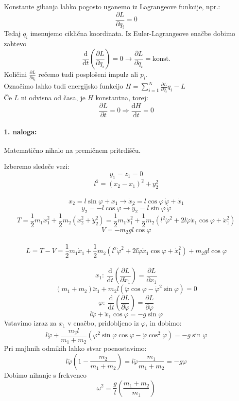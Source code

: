 \documentclass[a4paper]{article}
\newcommand{\pd}[2]{\frac{\partial {#1}}{\partial {#2}}}
\newcommand{\dd}[2]{\frac{\mathrm{d} {#1}}{\mathrm{d} {#2}}}
\begin{document}
Konstante gibanja lahko pogosto uganemo iz Lagrangeove funkcije, npr.:
$$\pd{L}{q_i} = 0$$
Tedaj $q_i$ imenujemo ciklična koordinata. Iz Euler-Lagrangeove enačbe dobimo zahtevo
$$\dd{}{t}\left(\pd{L}{\dot{q}_i}\right) = 0 \rightarrow \pd{L}{\dot{q}_i} = \text{konst.}$$
Količini $\displaystyle{\pd{L}{\dot{q}_i}}$ rečemo tudi posplošeni impulz ali $p_i$. \\[4mm]

Označimo lahko tudi energijsko funkcijo $\displaystyle{H = \sum_{i=1}^{N} \pd{L}{\dot{q}_i}}\dot{q}_i - L$ \\
Če $L$ ni odvisna od časa, je $H$ konstantna, torej:
$$\pd{L}{t} = 0 \Rightarrow \dd{H}{t} = 0$$
\paragraph{1. naloga:} Matematično nihalo na premičnem pritrdišču.
\begin{figure}[h!]
    \centering
\end{figure}
\newline
Izberemo sledeče vezi:
$$y_1 = z_1 = 0$$
$$l^2 = (x_2 - x_1)^2 + y_2^2$$
\\
$$x_2 = l\sin\varphi + x_1 \rightarrow \dot{x}_2 = l\cos\varphi \,\dot{\varphi} + \dot{x}_1$$
$$y_2 = -l\cos\varphi \rightarrow \dot{y}_2 = l\sin\varphi \,\dot{\varphi}$$
$$T = \frac{1}{2}m_1\dot{x}_1^2 + \frac{1}{2}m_2(\dot{x}_2^2 + \dot{y}_2^2) = \frac{1}{2}m_1\dot{x}_1^2 + \frac{1}{2}m_2\left(l^2\dot{\varphi}^2 + 2l\dot{\varphi}\dot{x}_1\cos\varphi + \dot{x}_1^2\right)$$
$$V = -m_2gl\cos\varphi$$
\\
$$L = T-V = \frac{1}{2}m_1\dot{x}_1 + \frac{1}{2}m_2\left(l^2\dot{\varphi}^2 + 2l\dot{\varphi}\dot{x}_1\cos\varphi + \dot{x}_1^2\right) + m_2gl\cos\varphi$$
\\
$$x_1:~\dd{}{t}\left(\pd{L}{\dot{x}_1}\right) = \pd{L}{x_1}$$
$$(m_1 + m_2)\ddot{x}_1 + m_2l\left(\ddot{\varphi}\cos\varphi - \dot{\varphi}^2\sin\varphi\right) = 0$$
\newpage
$$\varphi:~\dd{}{t} \left(\pd{L}{\dot{\varphi}}\right) = \pd{L}{\varphi}$$
$$l\ddot{\varphi} + \ddot{x}_1\cos\varphi = -g\sin\varphi$$
Vstavimo izraz za $\ddot{x}_1$ v enačbo, pridobljeno iz $\varphi$, in dobimo:
$$l\ddot{\varphi} + \frac{m_2l}{m_1 + m_2}\left(\varphi^2\sin\varphi\cos\varphi - \ddot{\varphi}\cos^2\varphi\right) = -g\sin\varphi$$
Pri majhnih odmikih lahko stvar poenostavimo: $$l\ddot{\varphi}\left( 1 - \frac{m_2}{m_1 + m_2} \right) = l\ddot{\varphi} \frac{m_1}{m_1 + m_2} = -g\varphi$$
Dobimo nihanje s frekvenco $$\omega^2 = \frac{g}{l}\left(\frac{m_1 + m_2}{m_1}\right)$$
\end{document}
